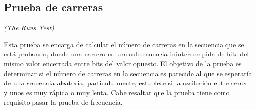

\subsection{Prueba de carreras} %
\textit{(The Runs Test)}


Esta prueba se encarga de calcular el número de carreras en la secuencia que
se está probando, donde una carrera es una subsecuencia ininterrumpida de
bits del mismo valor encerrada entre bits del valor opuesto. El objetivo de
la prueba es determinar si el número de carreras en la secuencia es parecido
al que se esperaría de una secuencia aleatoria, particularmente, establece si
la oscilación entre ceros y unos es muy rápida o muy lenta. Cabe resaltar que
la prueba tiene como requisito pasar la prueba de frecuencia.


